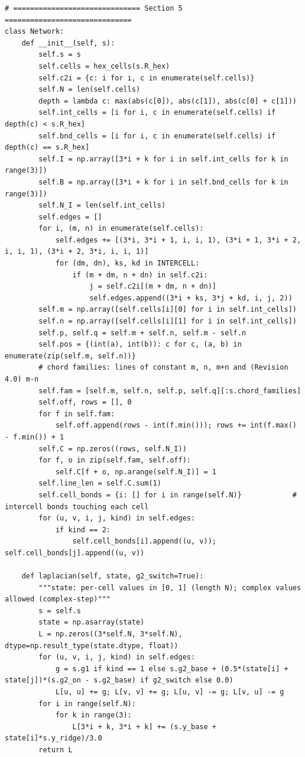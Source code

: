 \documentclass[11pt,a4paper]{article}
\theoremstyle{definition}
\theoremstyle{remark}
\begin{document}
\begin{lstlisting}
# ============================== Section 5 ==============================
class Network:
    def __init__(self, s):
        self.s = s
        self.cells = hex_cells(s.R_hex)
        self.c2i = {c: i for i, c in enumerate(self.cells)}
        self.N = len(self.cells)
        depth = lambda c: max(abs(c[0]), abs(c[1]), abs(c[0] + c[1]))
        self.int_cells = [i for i, c in enumerate(self.cells) if depth(c) < s.R_hex]
        self.bnd_cells = [i for i, c in enumerate(self.cells) if depth(c) == s.R_hex]
        self.I = np.array([3*i + k for i in self.int_cells for k in range(3)])
        self.B = np.array([3*i + k for i in self.bnd_cells for k in range(3)])
        self.N_I = len(self.int_cells)
        self.edges = []
        for i, (m, n) in enumerate(self.cells):
            self.edges += [(3*i, 3*i + 1, i, i, 1), (3*i + 1, 3*i + 2, i, i, 1), (3*i + 2, 3*i, i, i, 1)]
            for (dm, dn), ks, kd in INTERCELL:
                if (m + dm, n + dn) in self.c2i:
                    j = self.c2i[(m + dm, n + dn)]
                    self.edges.append((3*i + ks, 3*j + kd, i, j, 2))
        self.m = np.array([self.cells[i][0] for i in self.int_cells])
        self.n = np.array([self.cells[i][1] for i in self.int_cells])
        self.p, self.q = self.m + self.n, self.m - self.n
        self.pos = {(int(a), int(b)): c for c, (a, b) in enumerate(zip(self.m, self.n))}
        # chord families: lines of constant m, n, m+n and (Revision 4.0) m-n
        self.fam = [self.m, self.n, self.p, self.q][:s.chord_families]
        self.off, rows = [], 0
        for f in self.fam:
            self.off.append(rows - int(f.min())); rows += int(f.max() - f.min()) + 1
        self.C = np.zeros((rows, self.N_I))
        for f, o in zip(self.fam, self.off):
            self.C[f + o, np.arange(self.N_I)] = 1
        self.line_len = self.C.sum(1)
        self.cell_bonds = {i: [] for i in range(self.N)}            # intercell bonds touching each cell
        for (u, v, i, j, kind) in self.edges:
            if kind == 2:
                self.cell_bonds[i].append((u, v)); self.cell_bonds[j].append((u, v))

    def laplacian(self, state, g2_switch=True):
        """state: per-cell values in [0, 1] (length N); complex values allowed (complex-step)"""
        s = self.s
        state = np.asarray(state)
        L = np.zeros((3*self.N, 3*self.N), dtype=np.result_type(state.dtype, float))
        for (u, v, i, j, kind) in self.edges:
            g = s.g1 if kind == 1 else s.g2_base + (0.5*(state[i] + state[j])*(s.g2_on - s.g2_base) if g2_switch else 0.0)
            L[u, u] += g; L[v, v] += g; L[u, v] -= g; L[v, u] -= g
        for i in range(self.N):
            for k in range(3):
                L[3*i + k, 3*i + k] += (s.y_base + state[i]*s.y_ridge)/3.0
        return L


\end{lstlisting}
\end{document}
